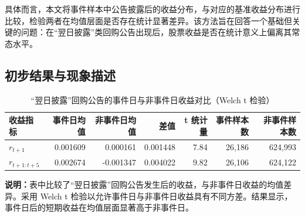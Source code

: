 \documentclass[a4paper,10pt]{article}
\begin{document}
具体而言，本文将事件样本中公告披露后的收益分布，与对应的基准收益分布进行比较，检验两者在均值层面是否存在统计显著差异。该方法旨在回答一个基础但关键的问题：在“翌日披露”类回购公告出现后，股票收益是否在统计意义上偏离其常态水平。


\subsection{初步结果与现象描述}

\begin{table}[H]
    \centering
    \caption{“翌日披露”回购公告的事件日与非事件日收益对比（Welch t 检验）}
    \label{tab:welch_event_vs_nonevent}
    \renewcommand{\arraystretch}{1.2}
    \begin{tabular}{l r r r r r r}
        \toprule
        \textbf{收益指标} & 
        \textbf{事件日均值} & 
        \textbf{非事件日均值} & 
        \textbf{差值} & 
        \textbf{t 统计量} & 
        \textbf{事件样本数} & 
        \textbf{非事件样本数} \\
        \midrule
        $r_{t+1}$ & 
        0.001609 & 
        0.000161 & 
        0.001448 & 
        7.84 & 
        26{,}186 & 
        624{,}993 \\
        $r_{t+1:t+5}$ & 
        0.002674 & 
        -0.001347 & 
        0.004022 & 
        9.82 & 
        26{,}106 & 
        624{,}122 \\
        \bottomrule
    \end{tabular}
    \vspace{0.2cm}
    \begin{flushleft}
        \footnotesize
        \textbf{说明：}表中比较了“翌日披露”回购公告发生后的收益，与非事件日收益的均值差异。采用 Welch t 检验以允许事件日与非事件日收益具有不同方差。结果显示，事件日后的短期收益在均值层面显著高于非事件日。
    \end{flushleft}
\end{table}
\end{document}
